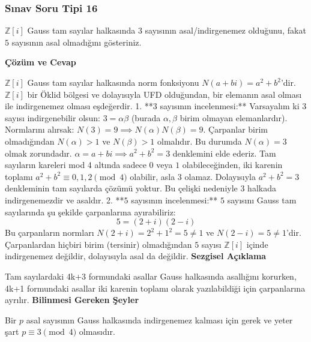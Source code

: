 \documentclass[11pt, a4paper]{article}
\newenvironment{cozum}{
    \vspace{0.5cm}
    \noindent\textcolor{green!60!black}{\faCheckCircle\enspace \textbf{\Large Çözüm ve Cevap}}\par\vspace{0.2cm}
}{}
\newenvironment{sezgisel}{
    \vspace{0.5cm}
    \noindent\textcolor{orange!80!black}{\faLightbulb\enspace \textbf{\Large Sezgisel Açıklama}}\par\vspace{0.2cm}
    \itshape
}{}
\newenvironment{bilgi}{
    \vspace{0.5cm}
    \noindent\textcolor{red!70!black}{\faExclamationTriangle\enspace \textbf{\Large Bilinmesi Gereken Şeyler}}\par\vspace{0.2cm}
}{}
\begin{document}
\subsubsection{Sınav Soru Tipi 16}
\begin{sinavbox}
$\mathbb{Z}[i]$ Gauss tam sayılar halkasında $3$ sayısının asal/indirgenemez olduğunu, fakat $5$ sayısının asal olmadığını gösteriniz.
\end{sinavbox}
\begin{cozum}
$\mathbb{Z}[i]$ Gauss tam sayılar halkasında norm fonksiyonu $N(a+bi) = a^2+b^2$'dir. $\mathbb{Z}[i]$ bir Öklid bölgesi ve dolayısıyla UFD olduğundan, bir elemanın asal olması ile indirgenemez olması eşdeğerdir.
1. **$3$ sayısının incelenmesi:**
   Varsayalım ki $3$ sayısı indirgenebilir olsun: $3 = \alpha \beta$ (burada $\alpha, \beta$ birim olmayan elemanlardır).
   Normlarını alırsak: $N(3) = 9 \implies N(\alpha)N(\beta) = 9$.
   Çarpanlar birim olmadığından $N(\alpha) > 1$ ve $N(\beta) > 1$ olmalıdır. Bu durumda $N(\alpha) = 3$ olmak zorundadır.
   $\alpha = a+bi \implies a^2+b^2 = 3$ denklemini elde ederiz.
   Tam sayıların kareleri mod 4 altında sadece $0$ veya $1$ olabileceğinden, iki karenin toplamı $a^2+b^2 \equiv 0, 1, 2 \pmod 4$ olabilir, asla $3$ olamaz.
   Dolayısıyla $a^2+b^2=3$ denkleminin tam sayılarda çözümü yoktur. Bu çelişki nedeniyle $3$ halkada indirgenemezdir ve asaldır.
2. **$5$ sayısının incelenmesi:**
   $5$ sayısını Gauss tam sayılarında şu şekilde çarpanlarına ayırabiliriz:
   \[ 5 = (2+i)(2-i) \]
   Bu çarpanların normları $N(2+i) = 2^2+1^2 = 5 \neq 1$ ve $N(2-i) = 5 \neq 1$'dir. Çarpanlardan hiçbiri birim (tersinir) olmadığından $5$ sayısı $\mathbb{Z}[i]$ içinde indirgenemez değildir, dolayısıyla asal da değildir.
\end{cozum}
\begin{sezgisel}
Tam sayılardaki 4k+3 formundaki asallar Gauss halkasında asallığını korurken, 4k+1 formundaki asallar iki karenin toplamı olarak yazılabildiği için çarpanlarına ayrılır.
\end{sezgisel}
\begin{bilgi}
Bir $p$ asal sayısının Gauss halkasında indirgenemez kalması için gerek ve yeter şart $p \equiv 3 \pmod 4$ olmasıdır.
\end{bilgi}

\newpage
\end{document}
